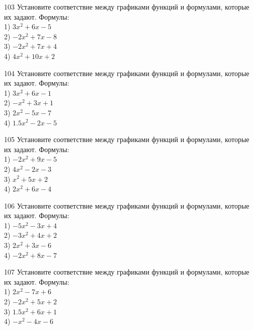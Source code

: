 \documentclass[4apaper]{article}
\begin{document}
\begin{taskBN}{103}
Установите соответствие между графиками функций и формулами, которые их задают. Формулы: \\1) $3x^2+6x-5$\\2) $-2x^2+7x-8$\\3) $-2x^2+7x+4$\\4) $4x^2+10x+2$
\end{taskBN}

\begin{taskBN}{104}
Установите соответствие между графиками функций и формулами, которые их задают. Формулы: \\1) $3x^2+6x-1$\\2) $-x^2+3x+1$\\3) $2x^2-5x-7$\\4) $1.5x^2-2x-5$
\end{taskBN}

\begin{taskBN}{105}
Установите соответствие между графиками функций и формулами, которые их задают. Формулы: \\1) $-2x^2+9x-5$\\2) $4x^2-2x-3$\\3) $x^2+5x+2$\\4) $2x^2+6x-4$
\end{taskBN}

\begin{taskBN}{106}
Установите соответствие между графиками функций и формулами, которые их задают. Формулы: \\1) $-5x^2-3x+4$\\2) $-3x^2+4x+2$\\3) $2x^2+3x-6$\\4) $-2x^2+8x-7$
\end{taskBN}

\begin{taskBN}{107}
Установите соответствие между графиками функций и формулами, которые их задают. Формулы: \\1) $2x^2-7x+6$\\2) $-2x^2+5x+2$\\3) $1.5x^2+6x+1$\\4) $-x^2-4x-6$
\end{taskBN}
\end{document}
